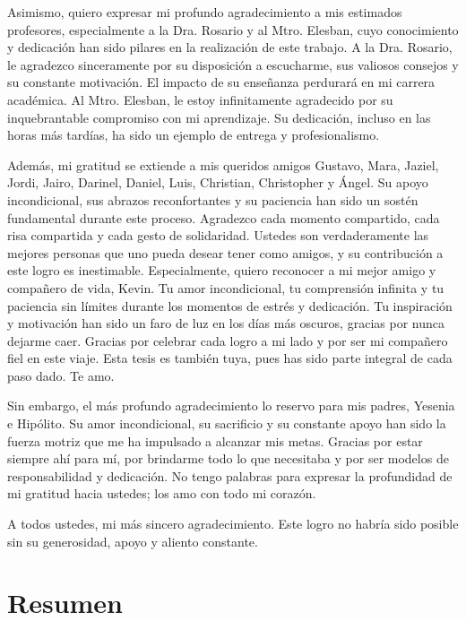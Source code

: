 \documentclass[
  us-letterpaper,
]{scrreprt}
\renewcommand*\contentsname{Tabla de contenidos}
\newcommand\contentsname{Tabla de contenidos}
\begin{document}
Asimismo, quiero expresar mi profundo agradecimiento a mis estimados profesores, especialmente a la Dra. Rosario y al Mtro. Elesban, cuyo conocimiento y dedicación han sido pilares en la realización de este trabajo. A la Dra. Rosario, le agradezco sinceramente por su disposición a escucharme, sus valiosos consejos y su constante motivación. El impacto de su enseñanza perdurará en mi carrera académica. Al Mtro. Elesban, le estoy infinitamente agradecido por su inquebrantable compromiso con mi aprendizaje. Su dedicación, incluso en las horas más tardías, ha sido un ejemplo de entrega y profesionalismo.

Además, mi gratitud se extiende a mis queridos amigos Gustavo, Mara, Jaziel, Jordi, Jairo, Darinel, Daniel, Luis, Christian, Christopher y Ángel. Su apoyo incondicional, sus abrazos reconfortantes y su paciencia han sido un sostén fundamental durante este proceso. Agradezco cada momento compartido, cada risa compartida y cada gesto de solidaridad. Ustedes son verdaderamente las mejores personas que uno pueda desear tener como amigos, y su contribución a este logro es inestimable. Especialmente, quiero reconocer a mi mejor amigo y compañero de vida, Kevin. Tu amor incondicional, tu comprensión infinita y tu paciencia sin límites durante los momentos de estrés y dedicación. Tu inspiración y motivación han sido un faro de luz en los días más oscuros, gracias por nunca dejarme caer. Gracias por celebrar cada logro a mi lado y por ser mi compañero fiel en este viaje. Esta tesis es también tuya, pues has sido parte integral de cada paso dado. Te amo.

Sin embargo, el más profundo agradecimiento lo reservo para mis padres, Yesenia e Hipólito. Su amor incondicional, su sacrificio y su constante apoyo han sido la fuerza motriz que me ha impulsado a alcanzar mis metas. Gracias por estar siempre ahí para mí, por brindarme todo lo que necesitaba y por ser modelos de responsabilidad y dedicación. No tengo palabras para expresar la profundidad de mi gratitud hacia ustedes; los amo con todo mi corazón.

A todos ustedes, mi más sincero agradecimiento. Este logro no habría sido posible sin su generosidad, apoyo y aliento constante.
\renewcommand*\contentsname{Tabla de contenidos}
{
\hypersetup{linkcolor=}
\setcounter{tocdepth}{2}
\tableofcontents
}

\chapter*{Resumen}\label{resumen}
\end{document}
